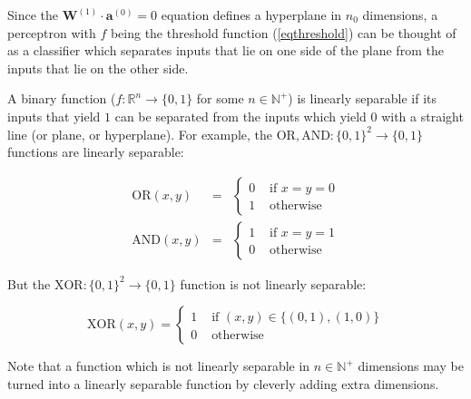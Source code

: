 \documentclass[titlepage]{article}
\begin{document}
            Since the $\mathbf{W}^{(1)} \cdot \mathbf{a}^{(0)} = 0$ equation
            defines a hyperplane in $n_0$ dimensions, a perceptron with $f$
            being the threshold function (\ref{eqthreshold}) can be thought
            of as a classifier which separates inputs that lie on one side of
            the plane from the inputs that lie on the other side.

            A binary function ($f : \mathbb{R}^n \rightarrow \{0, 1\}$ for some
            $n \in \mathbb{N}^+$) is linearly separable if its inputs that yield
            $1$ can be separated from the inputs which yield $0$ with a
            straight line (or plane, or hyperplane). For example, the
            $\text{OR}, \text{AND} : \{ 0, 1 \}^2 \rightarrow \{ 0, 1 \}$
            functions are linearly separable:

            \begin{eqnarray*}
              \text{OR}(x, y) & = & \begin{cases}
                  0 & \text{ if } x = y = 0 \\
                  1 & \text{ otherwise }
                \end{cases} \\
              \text{AND}(x, y) & = & \begin{cases}
                  1 & \text{ if } x = y = 1 \\
                  0 & \text{ otherwise}
                \end{cases}
            \end{eqnarray*}

            But the $\text{XOR} : \{ 0, 1 \}^2 \rightarrow \{ 0, 1 \}$ function
            is not linearly separable:

            \begin{equation*}
              \text{XOR}(x, y) = \begin{cases}
                  1 & \text{ if } (x, y) \in \{ (0, 1), (1, 0) \} \\
                  0 & \text{ otherwise}
                \end{cases}
            \end{equation*}

            Note that a function which is not linearly separable in
            $n \in \mathbb{N}^+$ dimensions may be turned into a linearly
            separable function by cleverly adding extra dimensions.

\newpage
\end{document}
